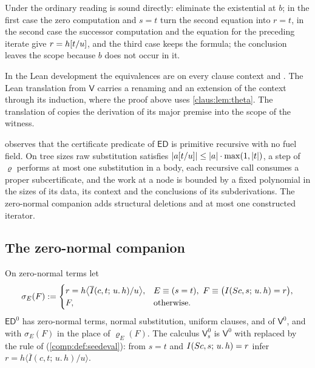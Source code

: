 Under the ordinary reading  is sound directly:
eliminate the existential at $b$; in the first case the zero computation
and $s=t$ turn the second equation into $r=t$, in the second case the
successor computation and the equation for the preceding iterate give
$r=h[t/u]$, and the third case keeps the formula; the conclusion
leaves the scope because $b$ does not occur in it.

\begin{remark}
\label{claus:rem:e3pkgs}
In the Lean development the equivalences are
 on every clause context and
. The Lean
translation from $\mathsf{V}$ carries a renaming and an extension of the
context through its induction, where the proof above uses
\cref{claus:lem:theta}. The translation of  copies the
derivation of its major premise into the scope of the witness.
\end{remark}

\begin{remark}
\label{claus:rem:fuel}
 observes that the certificate predicate of
$\mathsf{ED}$ is primitive recursive with no fuel field. On tree sizes
raw substitution satisfies
$|a[t/u]|\le|a|\cdot\max(1,|t|)$, a step of $\varrho$ performs at
most one substitution in a body, each recursive call consumes a proper
subcertificate, and the work at a node is bounded by a fixed polynomial
in the sizes of its data, its context and the conclusions of its
subderivations. The zero-normal companion adds structural deletions and
at most one constructed iterator.
\end{remark}

\subsection{The zero-normal companion}

\begin{definition}
\label{claus:def:e30}
On zero-normal terms let
\[
 \sigma_E(F)\mathrel{:=}
 \begin{cases}
 r=h\bigl\langle\overline{I}(c,t;\,u.\,h)/u\bigr\rangle,
   &E\equiv(s=t),\ F\equiv\bigl(I(S c,s;\,u.\,h)=r\bigr),\\
 F,&\text{otherwise.}
 \end{cases}
\]
$\mathsf{ED}^{0}$ has zero-normal terms, normal substitution, uniform
clauses,  and  of $\mathsf{V}^{0}$, and
 with $\sigma_E(F)$ in the place of $\varrho_E(F)$.
The calculus $\mathsf{V}^{0}_{\mathrm{s}}$ is $\mathsf{V}^{0}$ with
 replaced by the rule  of
 (\cref{comp:def:seedeval}): from $s=t$ and
$I(S c,s;\,u.\,h)=r$ infer
$r=h\langle\overline{I}(c,t;\,u.\,h)/u\rangle$.
\end{definition}

